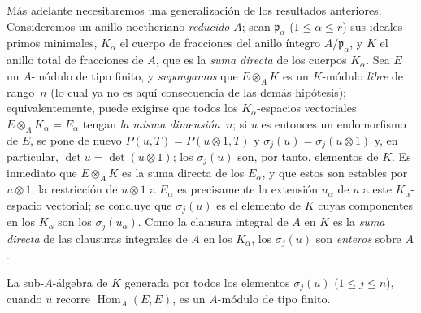 \documentclass[oneside,10pt]{amsart}
\renewcommand{\leq}{\leqslant}
\let\EGAOriginalLabel\label
\renewcommand{\label}[1]{\phantomsection\EGAOriginalLabel{#1}}
\begin{document}
\begin{remark}[6.4.7]
\label{II.6.4.7-fr}
Más adelante necesitaremos una generalización de los resultados anteriores.
Consideremos un anillo noetheriano \emph{reducido} $A$;
sean $\mathfrak{p}_\alpha$ ($1\leq\alpha\leq r$) sus ideales primos minimales, $K_\alpha$ el cuerpo de fracciones del anillo íntegro $A/\mathfrak{p}_\alpha$, y $K$ el anillo total de fracciones de $A$, que es la \emph{suma directa} de los cuerpos $K_\alpha$.
Sea $E$ un $A$-módulo de tipo finito, y \emph{supongamos} que $E\otimes_AK$ es un $K$-módulo \emph{libre} de rango~$n$ (lo cual ya no es aquí consecuencia de las demás hipótesis);
equivalentemente, puede exigirse que todos los $K_\alpha$-espacios vectoriales $E\otimes_AK_\alpha=E_\alpha$ tengan \emph{la misma dimensión~$n$};
si $u$ es entonces un endomorfismo de $E$, se pone de nuevo $P(u,T)=P(u\otimes1,T)$ y $\sigma_j(u)=\sigma_j(u\otimes1)$ y, en particular, $\det u=\det(u\otimes1)$;
los $\sigma_j(u)$ son, por tanto, elementos de $K$.
Es inmediato que $E\otimes_AK$ es la suma directa de los $E_\alpha$, y que estos son estables por $u\otimes1$;
la restricción de $u\otimes1$ a $E_\alpha$ es precisamente la extensión $u_\alpha$ de $u$ a este $K_\alpha$-espacio vectorial;
se concluye que $\sigma_j(u)$ es el elemento de $K$ cuyas componentes en los $K_\alpha$ son los $\sigma_j(u_\alpha)$.
Como la clausura integral de $A$ en $K$ es la \emph{suma directa} de las clausuras integrales de $A$ en los $K_\alpha$, los $\sigma_j(u)$ son \emph{enteros} sobre $A$.

\begin{lemma}[6.4.7.1]
\label{II.6.4.7.1-fr}
La sub-$A$-álgebra de $K$ generada por todos los elementos $\sigma_j(u)$ ($1\leq j\leq n$), cuando $u$ recorre $\operatorname{Hom}_A(E,E)$, es un $A$-módulo de tipo finito.
\end{lemma}


\end{remark}
\end{document}
